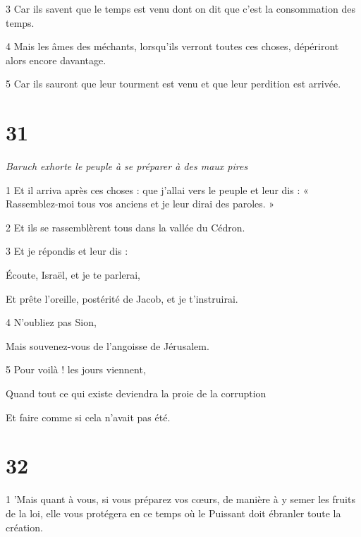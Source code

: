 \par 3 Car ils savent que le temps est venu dont on dit que c'est la consommation des temps.

\par 4 Mais les âmes des méchants, lorsqu'ils verront toutes ces choses, dépériront alors encore davantage.

\par 5 Car ils sauront que leur tourment est venu et que leur perdition est arrivée.

\chapter{31}

\par \textit{Baruch exhorte le peuple à se préparer à des maux pires}

\par 1 Et il arriva après ces choses : que j'allai vers le peuple et leur dis : « Rassemblez-moi tous vos anciens et je leur dirai des paroles. »

\par 2 Et ils se rassemblèrent tous dans la vallée du Cédron.

\par 3 Et je répondis et leur dis :

\par Écoute, Israël, et je te parlerai,

\par Et prête l'oreille, postérité de Jacob, et je t'instruirai.

\par 4 N'oubliez pas Sion,

\par Mais souvenez-vous de l'angoisse de Jérusalem.

\par 5 Pour voilà ! les jours viennent,

\par Quand tout ce qui existe deviendra la proie de la corruption

\par Et faire comme si cela n'avait pas été.

\chapter{32}

\par 1 'Mais quant à vous, si vous préparez vos cœurs, de manière à y semer les fruits de la loi, elle vous protégera en ce temps où le Puissant doit ébranler toute la création.

